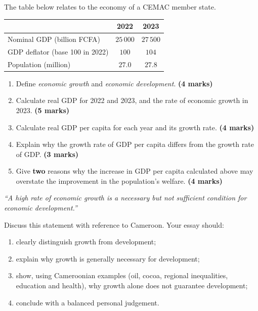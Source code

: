 \documentclass[11pt]{article}
\begin{document}
\begin{exercice}
The table below relates to the economy of a CEMAC member state.
\begin{center}
\begin{tabular}{|l|c|c|}
\hline
\rowcolor{popblueL} & \textbf{2022} & \textbf{2023} \\ \hline
Nominal GDP (billion FCFA) & $25\,000$ & $27\,500$ \\ \hline
GDP deflator (base 100 in 2022) & $100$ & $104$ \\ \hline
Population (million) & $27.0$ & $27.8$ \\ \hline
\end{tabular}
\end{center}
\begin{enumerate}
\item Define \emph{economic growth} and \emph{economic development}. \textbf{(4 marks)}
\item Calculate real GDP for 2022 and 2023, and the rate of economic growth in 2023. \textbf{(5 marks)}
\item Calculate real GDP per capita for each year and its growth rate. \textbf{(4 marks)}
\item Explain why the growth rate of GDP per capita differs from the growth rate of GDP. \textbf{(3 marks)}
\item Give \textbf{two} reasons why the increase in GDP per capita calculated above may overstate the improvement in the population's welfare. \textbf{(4 marks)}
\end{enumerate}
\end{exercice}

\begin{exercice}
\textit{``A high rate of economic growth is a necessary but not sufficient condition for economic development.''}

Discuss this statement with reference to Cameroon. Your essay should:
\begin{enumerate}
\item clearly distinguish growth from development;
\item explain why growth is generally necessary for development;
\item show, using Cameroonian examples (oil, cocoa, regional inequalities, education and health), why growth alone does not guarantee development;
\item conclude with a balanced personal judgement.
\end{enumerate}
\end{exercice}
\end{document}
